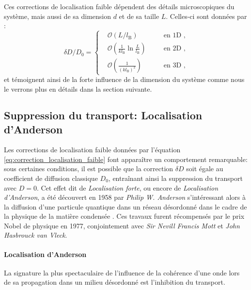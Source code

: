Ces corrections de localisation faible dépendent des détails microscopiques du système, mais aussi de sa dimension $d$ et de sa taille $L$. Celles-ci sont données par \citep{akkermans2007mesoscopic}:
\begin{equation}
\delta D/ D_{\mathrm{0}} = \left\lbrace \begin{aligned}
& \mathcal{O}\left(L/l_{\mathrm{B}}\right)  \quad &&\text{en 1D ,}\\
& \mathcal{O}\left(\frac{1}{k l_{\mathrm{B}}} \ln{\frac{L}{l_{\mathrm{B}}}} \right) \quad &&\text{en 2D ,}\\
& \mathcal{O}\left(\frac{1}{(k l_{\mathrm{B}})^2}\right) \quad &&\text{en 3D ,}
\end{aligned}\right.
\label{eq:correction_localisation_faible}
\end{equation}
et témoignent ainsi de la forte influence de la dimension du système comme nous le verrons plus en détails dans la section suivante.






\subsection{Suppression du transport: Localisation d'Anderson}
\label{sc:localisation_anderson}

Les corrections de localisation faible données par l'équation \ref{eq:correction_localisation_faible} font apparaître un comportement remarquable: sous certaines conditions, il est possible que la correction $\delta D$ soit égale au coefficient de diffusion classique $D_{\mathrm{0}}$, entraînant ainsi la suppression du transport avec $D=0$. Cet effet dit de \emph{Localisation forte}, ou encore de \emph{Localisation d'Anderson}, a été découvert en 1958 par \emph{Philip W. Anderson} s'intéressant alors à la diffusion d'une particule quantique dans un réseau désordonné dans le cadre de la physique de la matière condensée \citep{anderson1958absence}. Ces travaux furent récompensés par le prix Nobel de physique en 1977, conjointement avec \emph{Sir Nevill Francis Mott} et \emph{John Hasbrouck van Vleck}. 



\paragraph*{Localisation d'Anderson}
La signature la plus spectaculaire de l'influence de la cohérence d'une onde lors de sa propagation dans un milieu désordonné est l'inhibition du transport. 

